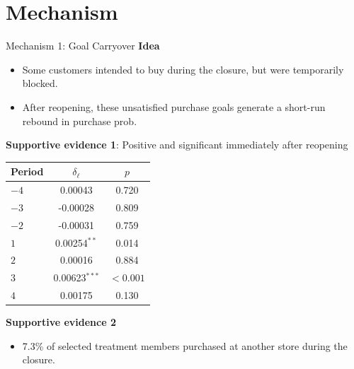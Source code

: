\documentclass[aspectratio=169]{beamer}  %
\begin{document}
\section{Mechanism}
\begin{frame}{Mechanism 1: Goal Carryover}
\footnotesize
\textbf{Idea}
\begin{itemize}
    \item Some customers intended to buy during the closure, but were temporarily blocked.
    \item After reopening, these unsatisfied purchase goals generate a short-run rebound in purchase prob.
\end{itemize}

\textbf{Supportive evidence 1}: Positive and significant immediately after reopening

\begin{table}
\scriptsize
\centering
\begin{tabular}{lcc}
\toprule
Period & $\delta_\ell$ & $p$ \\
\midrule
$-4$ & 0.00043 & 0.720 \\
$-3$ & -0.00028 & 0.809 \\
$-2$ & -0.00031 & 0.759 \\
$1$  & 0.00254$^{**}$ & 0.014 \\
$2$  & 0.00016 & 0.884 \\
$3$  & 0.00623$^{***}$ & $<0.001$ \\
$4$  & 0.00175 & 0.130 \\
\bottomrule
\end{tabular}
\end{table}

\textbf{Supportive evidence 2}
\begin{itemize}
    \item 7.3\% of selected treatment members purchased at another store during the closure.
\end{itemize}
\end{frame}
\end{document}
